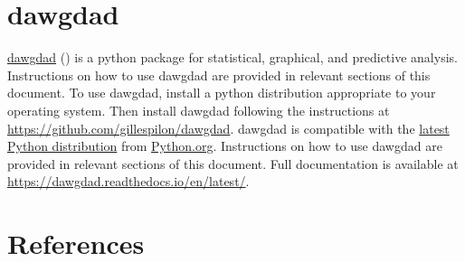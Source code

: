 \documentclass[10pt, letterpaper, twoside]{article}
\begin{document}
\section{dawgdad}\label{sec:dawgdad}
\href{https://github.com/gillespilon/dawgdad}{dawgdad} (\cite{dawgdad}) is a \Gls{python} package for statistical, graphical, and predictive analysis. Instructions on how to use dawgdad are provided in relevant sections of this document. To use dawgdad, install a \Gls{python} distribution appropriate to your operating system. Then install dawgdad following the instructions  at \href{https://github.com/gillespilon/dawgdad}{https://github.com/gillespilon/dawgdad}. dawgdad is compatible with the \href{https://www.python.org/downloads/}{latest Python distribution} from \href{https://www.python.org/}{Python.org}. Instructions on how to use dawgdad are provided in relevant sections of this document. Full documentation is available at \href{https://dawgdad.readthedocs.io/en/latest/}{https://dawgdad.readthedocs.io/en/latest/}.
\newpage
\printunsrtglossary[type={abbreviations}]
\newpage
\printunsrtglossary[style={indexgroup}]
\newpage
\section{References}\label{sec:references}
\printbibliography[heading=none]
\end{document}
